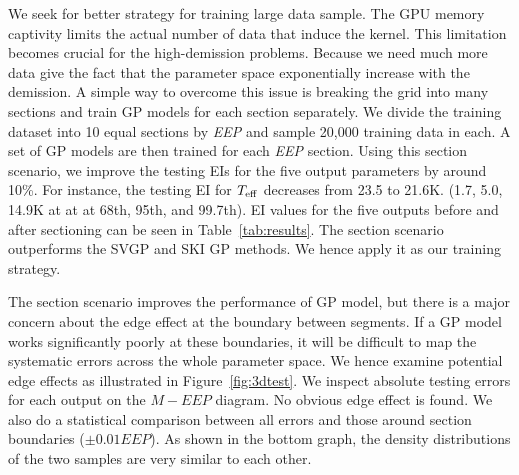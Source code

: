We seek for better strategy for training large data sample.
The GPU memory captivity limits the actual number of data that induce the kernel. This limitation becomes crucial for the high-demission problems. Because we need much more data give the fact that the parameter space exponentially increase with the demission. 
%
A simple way to overcome this issue is breaking the grid into many sections and train GP models for each section separately. 
We divide the training dataset into 10 equal sections by {\it EEP} and sample 20,000 training data in each. A set of GP models are then trained for each {\it EEP} section. 
%
Using this section scenario, we improve the testing EIs for the five output parameters by around 10\%. For instance, the testing EI for $T_{\rm eff}$ decreases from 23.5 to 21.6K. (1.7, 5.0, 14.9K at at  at 68th, 95th, and 99.7th). EI values for the five outputs before and after sectioning can be seen in Table~\ref{tab:results}.  The section scenario outperforms the SVGP and SKI GP methods. We hence apply it as our training strategy. 
 
The section scenario improves the performance of GP model, but there is a major concern about the edge effect at the boundary between segments. If a GP model works significantly poorly at these boundaries, it will be difficult to map the systematic errors across the whole parameter space. We hence examine potential edge effects as illustrated in Figure~\ref{fig:3dtest}. We inspect absolute testing errors for each output on the $M-EEP$ diagram. No obvious edge effect is found. We also do a statistical comparison between all errors and those around section boundaries ($\pm0.01EEP$). As shown in the bottom graph, the density distributions of the two samples are very similar to each other. 



